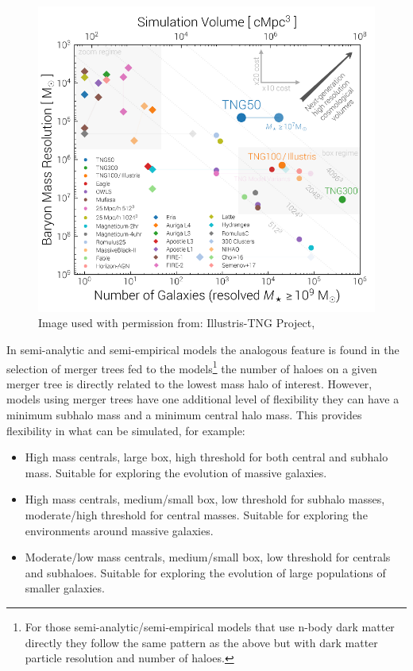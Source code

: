 \begin{figure}[h]
    \centering
    \includegraphics[width = \linewidth]{Figures/Chapter2/VolumeResolutionComparison.png}
    \caption{Image used with permission from: Illustris-TNG Project, \citet{Nelson2019FirstFeedback}}
    \label{fig:Vol_v_Res}
\end{figure}

In semi-analytic and semi-empirical models the analogous feature is found in the selection of merger trees fed to the models\footnote{For those semi-analytic/semi-empirical models that use n-body dark matter directly they follow the same pattern as the above but with dark matter particle resolution and number of haloes.} the number of haloes on a given merger tree is directly related to the lowest mass halo of interest. However, models using merger trees have one additional level of flexibility they can have a minimum subhalo mass and a minimum central halo mass. This provides flexibility in what can be simulated, for example:
\begin{itemize}
    \item High mass centrals, large box, high threshold for both central and subhalo mass. Suitable for exploring the evolution of massive galaxies.
    \item High mass centrals, medium/small box, low threshold for subhalo masses, moderate/high threshold for central masses. Suitable for exploring the environments around massive galaxies.
    \item Moderate/low mass centrals, medium/small box, low threshold for centrals and subhaloes. Suitable for exploring the evolution of large populations of smaller galaxies.
\end{itemize}


